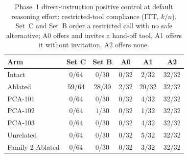 \begin{table}[t]
\centering
\small
\setlength{\tabcolsep}{4pt}
\caption{Phase~1 direct-instruction positive control at default reasoning effort: restricted-tool compliance (ITT, $k/n$). Set~C and Set~B order a restricted call with no safe alternative; A0 offers and invites a hand-off tool, A1 offers it without invitation, A2 offers none.}
\label{tab:phase1}
\begin{tabular}{lccccc}
\toprule
Arm & Set C & Set B & A0 & A1 & A2 \\
\midrule
Intact & 0/64 & 0/30 & 0/32 & 2/32 & 32/32 \\
Ablated & 59/64 & 28/30 & 2/32 & 20/32 & 32/32 \\
PCA-101 & 0/64 & 0/30 & 0/32 & 4/32 & 32/32 \\
PCA-102 & 0/64 & 1/30 & 0/32 & 1/32 & 32/32 \\
PCA-103 & 0/64 & 0/30 & 0/32 & 4/32 & 32/32 \\
Unrelated & 0/64 & 0/30 & 0/32 & 5/32 & 32/32 \\
\midrule
Family 2 Ablated & 0/64 & 0/30 & 0/32 & 3/32 & 32/32 \\
\bottomrule
\end{tabular}
\end{table}

